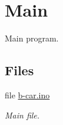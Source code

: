 \hypertarget{group__main}{}\section{Main}
\label{group__main}


Main program.  


\subsection*{Files}
\begin{DoxyCompactItemize}
\item 
file \hyperlink{b-car_8ino}{b-\/car.\+ino}
\begin{DoxyCompactList}\small\item\em Main file. \end{DoxyCompactList}\end{DoxyCompactItemize}
